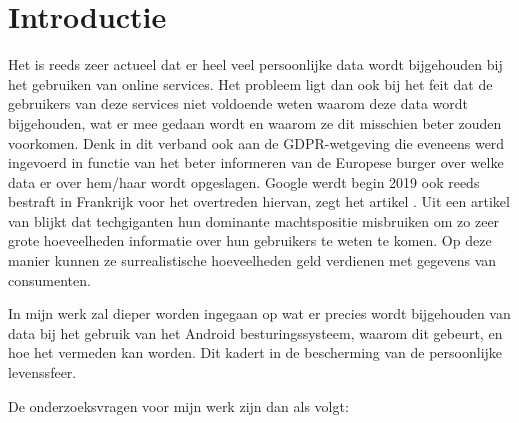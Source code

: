 
\section{Introductie} %
\label{sec:introductie}



Het is reeds zeer actueel dat er heel veel persoonlijke data wordt bijgehouden bij het gebruiken van online services. Het probleem ligt dan ook bij het feit dat de gebruikers van deze services niet voldoende weten waarom deze data wordt bijgehouden, wat er mee gedaan wordt en waarom ze dit misschien beter zouden voorkomen. Denk in dit verband ook aan de GDPR-wetgeving die eveneens werd ingevoerd in functie van het beter informeren van de Europese burger over welke data er over hem/haar wordt opgeslagen. Google werdt begin 2019 ook reeds bestraft in Frankrijk voor het overtreden hiervan, zegt het artikel \autocite{Boete2019}. Uit een artikel van \autocite{LaurensVerhagen2019} blijkt dat techgiganten hun dominante machtspositie misbruiken om zo zeer grote hoeveelheden informatie over hun gebruikers te weten te komen. Op deze manier kunnen ze surrealistische hoeveelheden geld verdienen met gegevens van consumenten.

\vspace{3mm}

\noindent In mijn werk zal dieper worden ingegaan op wat er precies wordt bijgehouden van data bij het gebruik van het Android besturingssysteem, waarom dit gebeurt, en hoe het vermeden kan worden. Dit kadert in de bescherming van de persoonlijke levenssfeer. 

\vspace{3mm}

\noindent De onderzoeksvragen voor mijn werk zijn dan als volgt:


